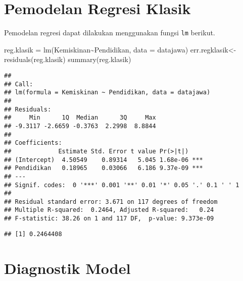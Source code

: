 \documentclass[
]{book}
\newenvironment{Shaded}{\begin{snugshade}}{\end{snugshade}}
\newcommand{\AttributeTok}[1]{\textcolor[rgb]{0.77,0.63,0.00}{#1}}
\newcommand{\DecValTok}[1]{\textcolor[rgb]{0.00,0.00,0.81}{#1}}
\newcommand{\FunctionTok}[1]{\textcolor[rgb]{0.00,0.00,0.00}{#1}}
\newcommand{\NormalTok}[1]{#1}
\newcommand{\OtherTok}[1]{\textcolor[rgb]{0.56,0.35,0.01}{#1}}
\newcommand{\SpecialCharTok}[1]{\textcolor[rgb]{0.00,0.00,0.00}{#1}}
\begin{document}
\hypertarget{pemodelan-regresi-klasik}{%
\section{Pemodelan Regresi Klasik}\label{pemodelan-regresi-klasik}}

Pemodelan regresi dapat dilakukan menggunakan fungsi \texttt{lm} berikut.

\begin{Shaded}
\begin{Highlighting}[]
\NormalTok{reg.klasik }\OtherTok{=} \FunctionTok{lm}\NormalTok{(Kemiskinan}\SpecialCharTok{\textasciitilde{}}\NormalTok{Pendidikan, }\AttributeTok{data =}\NormalTok{ datajawa)}
\NormalTok{err.regklasik}\OtherTok{\textless{}{-}}\FunctionTok{residuals}\NormalTok{(reg.klasik)}
\FunctionTok{summary}\NormalTok{(reg.klasik)}
\end{Highlighting}
\end{Shaded}

\begin{verbatim}
## 
## Call:
## lm(formula = Kemiskinan ~ Pendidikan, data = datajawa)
## 
## Residuals:
##     Min      1Q  Median      3Q     Max 
## -9.3117 -2.6659 -0.3763  2.2998  8.8844 
## 
## Coefficients:
##             Estimate Std. Error t value Pr(>|t|)    
## (Intercept)  4.50549    0.89314   5.045 1.68e-06 ***
## Pendidikan   0.18965    0.03066   6.186 9.37e-09 ***
## ---
## Signif. codes:  0 '***' 0.001 '**' 0.01 '*' 0.05 '.' 0.1 ' ' 1
## 
## Residual standard error: 3.671 on 117 degrees of freedom
## Multiple R-squared:  0.2464, Adjusted R-squared:   0.24 
## F-statistic: 38.26 on 1 and 117 DF,  p-value: 9.373e-09
\end{verbatim}

\begin{Shaded}
\end{Shaded}

\begin{verbatim}
## [1] 0.2464408
\end{verbatim}

\hypertarget{diagnostik-model}{%
\section{Diagnostik Model}\label{diagnostik-model}}
\end{document}
